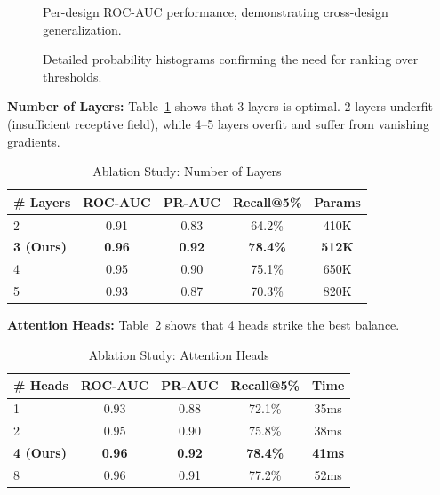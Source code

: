 \documentclass[10pt,twocolumn,journal]{IEEEtran}
\begin{document}
\begin{figure}[t]
\centering
{}
\caption{Per-design ROC-AUC performance, demonstrating cross-design generalization.}
\label{fig:per_design_auc}
\end{figure}

\begin{figure}[t]
\centering
{}
\caption{Detailed probability histograms confirming the need for ranking over thresholds.}
\label{fig:histograms}
\end{figure}

\textbf{Number of Layers:} Table~\ref{tab:ablation_layers} shows that 3 layers is optimal. 2 layers underfit (insufficient receptive field), while 4--5 layers overfit and suffer from vanishing gradients.

\begin{table}[t]
\centering
\caption{Ablation Study: Number of Layers}
\label{tab:ablation_layers}
\begin{tabular}{@{}lcccc@{}}
\toprule
\textbf{\# Layers} & \textbf{ROC-AUC} & \textbf{PR-AUC} & \textbf{Recall@5\%} & \textbf{Params} \\
\midrule
2 & 0.91 & 0.83 & 64.2\% & 410K \\
\textbf{3 (Ours)} & \textbf{0.96} & \textbf{0.92} & \textbf{78.4\%} & \textbf{512K} \\
4 & 0.95 & 0.90 & 75.1\% & 650K \\
5 & 0.93 & 0.87 & 70.3\% & 820K \\
\bottomrule
\end{tabular}
\end{table}

\textbf{Attention Heads:} Table~\ref{tab:ablation_heads} shows that 4 heads strike the best balance.

\begin{table}[t]
\centering
\caption{Ablation Study: Attention Heads}
\label{tab:ablation_heads}
\begin{tabular}{@{}lcccc@{}}
\toprule
\textbf{\# Heads} & \textbf{ROC-AUC} & \textbf{PR-AUC} & \textbf{Recall@5\%} & \textbf{Time} \\
\midrule
1 & 0.93 & 0.88 & 72.1\% & 35ms \\
2 & 0.95 & 0.90 & 75.8\% & 38ms \\
\textbf{4 (Ours)} & \textbf{0.96} & \textbf{0.92} & \textbf{78.4\%} & \textbf{41ms} \\
8 & 0.96 & 0.91 & 77.2\% & 52ms \\
\bottomrule
\end{tabular}
\end{table}
\end{document}
